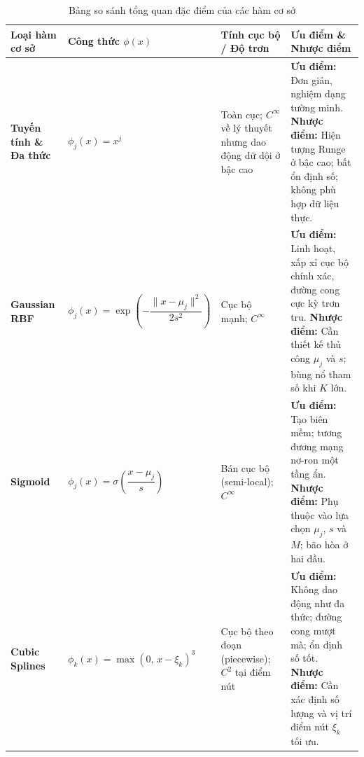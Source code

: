 \begin{table}[H]
    \centering
    \caption{\centering Bảng so sánh tổng quan đặc điểm của các hàm cơ sở}
    \label{tab:basis_functions_comparison}
    \renewcommand{\arraystretch}{1.8}
    \begin{tabular}{|>{\raggedright\arraybackslash}p{2.8cm}
                    |>{\raggedright\arraybackslash}p{4cm}
                    |>{\raggedright\arraybackslash}p{3.5cm}
                    |>{\raggedright\arraybackslash}p{5cm}|}
        \hline
        \textbf{Loại hàm cơ sở} 
            & \textbf{Công thức $\phi(x)$} 
            & \textbf{Tính cục bộ / Độ trơn} 
            & \textbf{Ưu điểm \& Nhược điểm} \\
        \hline
        \textbf{Tuyến tính \& Đa thức} 
            & $\phi_{j}(x)=x^{j}$ 
            & Toàn cục; $C^{\infty}$ về lý thuyết 
              nhưng dao động dữ dội ở bậc cao 
            & \textbf{Ưu điểm:} Đơn giản, nghiệm dạng tường minh.
              \newline
              \textbf{Nhược điểm:} Hiện tượng Runge ở bậc cao; 
              bất ổn định số; không phù hợp dữ liệu thực. \\
        \hline
        \textbf{Gaussian RBF} 
            & $\phi_{j}(x)=\exp\!\left(-\dfrac{\|x-\mu_{j}\|^{2}}
              {2s^{2}}\right)$ 
            & Cục bộ mạnh; $C^{\infty}$ 
            & \textbf{Ưu điểm:} Linh hoạt, xấp xỉ cục bộ chính xác, 
              đường cong cực kỳ trơn tru.\newline
              \textbf{Nhược điểm:} Cần thiết kế thủ công $\mu_j$ và $s$; 
              bùng nổ tham số khi $K$ lớn. \\
        \hline
        \textbf{Sigmoid} 
            & $\phi_{j}(x)=\sigma\!\left(\dfrac{x-\mu_{j}}{s}
              \right)$ 
            & Bán cục bộ (semi-local); $C^{\infty}$ 
            & \textbf{Ưu điểm:} Tạo biên mềm; tương đương mạng 
              nơ-ron một tầng ẩn.\newline
              \textbf{Nhược điểm:} Phụ thuộc vào lựa chọn $\mu_j$, 
              $s$ và $M$; bão hòa ở hai đầu. \\
        \hline
        \textbf{Cubic Splines} 
            & $\phi_{k}(x) = \max(0,\, x - \xi_k)^3$ 
            & Cục bộ theo đoạn (piecewise); $C^{2}$ tại điểm nút 
            & \textbf{Ưu điểm:} Không dao động như đa thức; đường cong 
              mượt mà; ổn định số tốt.\newline
              \textbf{Nhược điểm:} Cần xác định số lượng và vị trí 
              điểm nút $\xi_k$ tối ưu. \\
        \hline
    \end{tabular}
\end{table}
